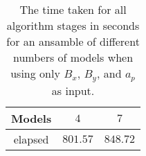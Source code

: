 \begin{table}[!ht]
	\centering
	\begin{tabular}{|c|c|c|}
		\hline
		Models & $4$ & $7$ \\ \hline
		elapsed & $801.57$ & $848.72$ \\ \hline
	\end{tabular}
	\caption{The time taken for all algorithm stages in seconds for an ansamble of different numbers of models when using only $B_{x}$, $B_{y}$, and $a_{p}$ as input.}
	\label{tab:time:ansamble:reverse:xyap}
\end{table}
